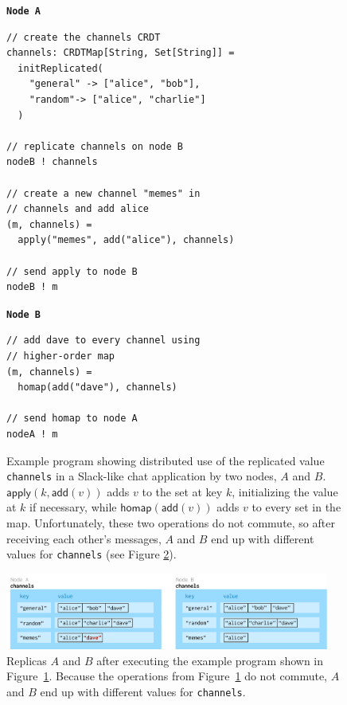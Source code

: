 \documentclass[acmsmall,nonacm,12pt]{acmart}
\newcommand{\msf}[1]{\ensuremath{\mathsf{#1}}}
\theoremstyle{plain}
\theoremstyle{definition}
\begin{document}
\begin{figure}[!htb]
    \centering
    \begin{minipage}{.5\textwidth}
        \centering
        \textbf{\texttt{Node A}}
\begin{lstlisting}
// create the channels CRDT 
channels: CRDTMap[String, Set[String]] = 
  initReplicated(
    "general" -> ["alice", "bob"], 
    "random"-> ["alice", "charlie"]
  )

// replicate channels on node B
nodeB ! channels

// create a new channel "memes" in 
// channels and add alice
(m, channels) = 
  apply("memes", add("alice"), channels)

// send apply to node B
nodeB ! m
\end{lstlisting}
    \end{minipage}%
    \begin{minipage}{0.5\textwidth}
        \centering
        \textbf{\texttt{Node B}}
        \scriptsize
\begin{lstlisting}
// add dave to every channel using 
// higher-order map
(m, channels) = 
  homap(add("dave"), channels)

// send homap to node A
nodeA ! m
\end{lstlisting}
        \normalsize        
        \hfill
    \end{minipage}
    
\caption{Example program showing distributed use of the replicated value \texttt{channels} in a Slack-like chat application by two nodes, $A$ and $B$.  $\msf{apply}(k, \msf{add}(v))$ adds $v$ to the set at key $k$, initializing the value at $k$ if necessary, while $\msf{homap}(\msf{add}(v))$ adds $v$ to every set in the map.  Unfortunately, these two operations do not commute, so after receiving each other's messages, $A$ and $B$ end up with different values for \texttt{channels} (see Figure \ref{fig:dictionaries}).}
\label{fig:pseudo}
\end{figure}

\begin{figure}[!htb]
\centering
\includegraphics[width=0.95\textwidth]{nodea-nodeb-dictionaries.pdf}
\caption{Replicas $A$ and $B$ after executing the example program shown in Figure~\ref{fig:pseudo}. Because the operations from Figure~\ref{fig:pseudo} do not commute, $A$ and $B$ end up with different values for \texttt{channels}.}
\label{fig:dictionaries}
\end{figure}
\end{document}
